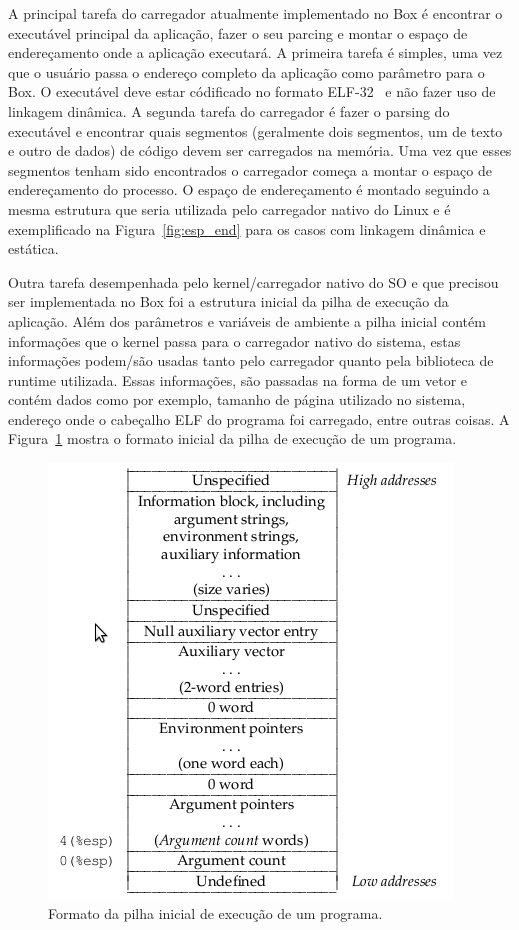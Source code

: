 \documentclass[11pt,twoside]{article}
\begin{document}
A principal tarefa do carregador atualmente implementado no Box é 
encontrar o executável principal da aplicação, fazer o seu parcing e
montar o espaço de endereçamento onde a aplicação executará. A primeira
tarefa é simples, uma vez que o usuário passa o endereço completo da
aplicação como parâmetro para o Box. O executável deve estar códificado
no formato ELF-32~\cite{elf} e não fazer uso de linkagem dinâmica. A 
segunda tarefa do carregador é fazer o parsing do executável e encontrar
quais segmentos (geralmente dois segmentos, um de texto e outro de dados) 
de código devem ser carregados na memória. Uma vez que esses segmentos 
tenham sido encontrados o carregador começa a montar o espaço de 
endereçamento do processo. O espaço de endereçamento é montado seguindo
a mesma estrutura que seria utilizada pelo carregador nativo do Linux e
é exemplificado na Figura~\ref{fig:esp_end} para os casos com linkagem
dinâmica e estática.

Outra tarefa desempenhada pelo kernel/carregador nativo do SO e que
precisou ser implementada no Box foi a estrutura inicial da pilha de
execução da aplicação. Além dos parâmetros e variáveis de ambiente a
pilha inicial contém informações que o kernel passa para o carregador
nativo do sistema, estas informações podem/são usadas tanto pelo
carregador quanto pela biblioteca de runtime utilizada. Essas informações,
são passadas na forma de um vetor e contém dados como por exemplo, 
tamanho de página utilizado no sistema, endereço onde o cabeçalho ELF do 
programa foi carregado, entre outras coisas. A Figura~\ref{fig:stack_ini}
mostra o formato inicial da pilha de execução de um programa.

\begin{figure}[!h]
  	\begin{center}
    	\includegraphics[scale=0.5]{figures/stack_ini.png}
	\end{center}
	\caption{Formato da pilha inicial de execução de um programa.}
	\label{fig:stack_ini}
\end{figure}
\end{document}
